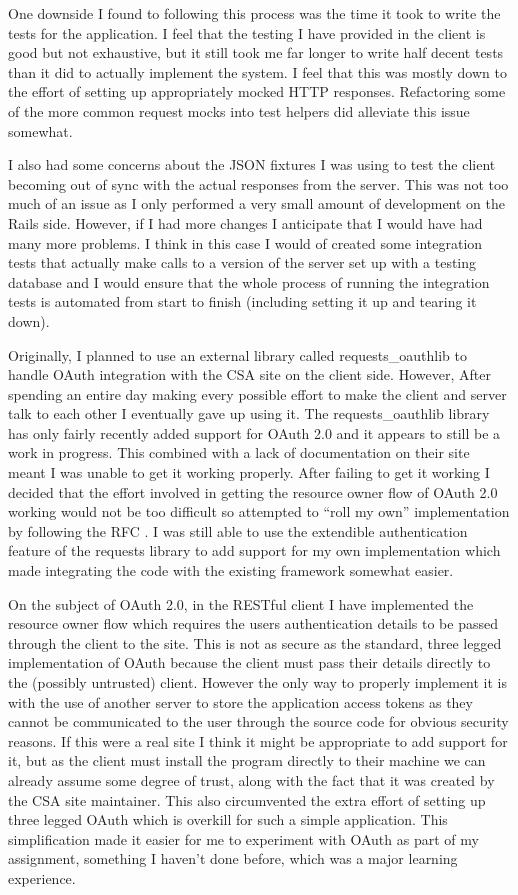 \documentclass[paper=a4, fontsize=11pt]{scrartcl}	%
\numberwithin{equation}{section}															%
\numberwithin{figure}{section}																%
\numberwithin{table}{section}
\begin{document}
One downside I found to following this process was the time it took to write the tests for the application. I feel that the testing I have provided in the client is good but not exhaustive, but it still took me far longer to write half decent tests than it did to actually implement the system. I feel that this was mostly down to the effort of setting up appropriately mocked HTTP responses. Refactoring some of the more common request mocks into test helpers did alleviate this issue somewhat. 

I also had some concerns about the JSON fixtures I was using to test the client becoming out of sync with the actual responses from the server. This was not too much of an issue as I only performed a very small amount of development on the Rails side. However, if I had more changes I anticipate that I would have had many more problems. I think in this case I would of created some integration tests that actually make calls to a version of the server set up with a testing database and I would ensure that the whole process of running the integration tests is automated from start to finish (including setting it up and tearing it down).

Originally, I planned to use an external library called requests\_oauthlib to handle OAuth integration with the CSA site on the client side. However, After spending an entire day making every possible effort to make the client and server talk to each other I eventually gave up using it. The requests\_oauthlib library has only fairly recently added support for OAuth 2.0 and it appears to still be a work in progress. This combined with a lack of documentation on their site meant I was unable to get it working properly. After failing to get it working I decided that the effort involved in getting the resource owner flow of OAuth 2.0 working would not be too difficult so attempted to ``roll my own'' implementation by following the RFC \citep{rfc6749resourceOwner}. I was still able to use the extendible  authentication feature of the requests library to add support for my own implementation which made integrating the code with the existing framework somewhat easier.

On the subject of OAuth 2.0, in the RESTful client I have implemented the resource owner flow which requires the users authentication details to be passed through the client to the site. This is not as secure as the standard, three legged implementation of OAuth because the client must pass their details directly to the (possibly untrusted) client. However the only way to properly implement it is with the use of another server to store the application access tokens as they cannot be communicated to the user through the source code for obvious security reasons. If this were a real site I think it might be appropriate to add support for it, but as the client must install the program directly to their machine we can already assume some degree of trust, along with the fact that it was created by the CSA site maintainer. This also circumvented the extra effort of setting up three legged OAuth which is overkill for such a simple application. This simplification made it easier for me to experiment with OAuth as part of my assignment, something I haven't done before, which was a major learning experience.
\end{document}
